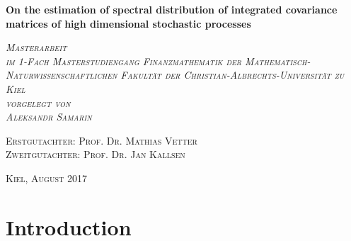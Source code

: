 \documentclass[a4paper,11pt]{book}
\date{}
\author{}
\theoremstyle{plain}
\theoremstyle{definition}
\begin{document}
	\begin{titlepage}
		\centering
		{\huge\bfseries On the estimation of spectral distribution of integrated covariance matrices of high dimensional stochastic processes\par}
		\vspace{2cm}
		{\Large\itshape \textsc{ Masterarbeit \\
			\bigskip 
			im 1-Fach Masterstudiengang Finanzmathematik der Mathematisch-Naturwissenschaftlichen Fakult\"at der Christian-Albrechts-Universit\"at zu Kiel \\
			\bigskip 
			vorgelegt von \\
			Aleksandr Samarin}}
		\vfill
		\raggedright
		\large
		\textsc{Erstgutachter: Prof. Dr. Mathias Vetter} \\
		\bigskip 
		\bigskip
		\textsc{Zweitgutachter: Prof. Dr. Jan Kallsen} \\
		\vfill
		\centering
		{\large \textsc{Kiel, August 2017} \par}
	\end{titlepage}

	
	\normalsize
	
	\tableofcontents
	
	\chapter{Introduction}
	
\end{document}
